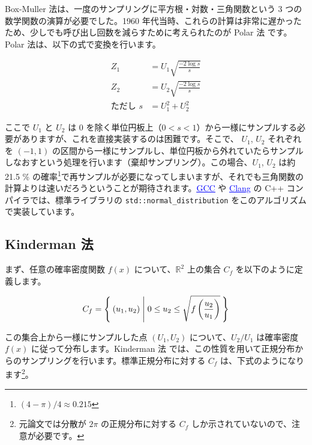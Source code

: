 \documentclass[twocolumn, dvipdfmx]{jsarticle}
\begin{document}
Box-Muller 法は、一度のサンプリングに平方根・対数・三角関数という 3 つの数学関数の演算が必要でした。1960 年代当時、これらの計算は非常に遅かったため、少しでも呼び出し回数を減らすために考えられたのが Polar 法 \cite{marsaglia1964convinient} です。Polar 法は、以下の式で変換を行います。

\begin{align*}
    Z_1 &= U_1 \sqrt{\frac{-2 \log s}{s}} \\
    Z_2 &= U_2 \sqrt{\frac{-2 \log s}{s}} \\
    \textrm{ただし } s &= U_1 ^2 + U_2 ^2
\end{align*}

ここで $U_1$ と $U_2$ は $0$ を除く単位円板上（$0 < s < 1$）から一様にサンプルする必要がありますが、これを直接実装するのは困難です。そこで、 $U_1$, $U_2$ それぞれを $(-1, 1)$ の区間から一様にサンプルし、単位円板から外れていたらサンプルしなおすという処理を行います（棄却サンプリング）。この場合、$U_1$, $U_2$ は約 21.5 \% の確率\footnote{$(4 - \pi) / 4 \approx 0.215$}で再サンプルが必要になってしまいますが、それでも三角関数の計算よりは速いだろうということが期待されます。\href{https://github.com/gcc-mirror/gcc/blob/60d9f254876a00260992b2f37639ef4d82d9db8f/libstdc++-v3/include/bits/random.tcc#L1818-L1830}{\textcolor{blue}{\underline{GCC}}} や \href{https://github.com/llvm/llvm-project/blob/31dfaff3b395a19f23bb1010bfcec67452efe02d/libcxx/include/random#L4370-L4383}{\textcolor{blue}{\underline{Clang}}} の C++ コンパイラでは、標準ライブラリの \texttt{std::normal\_distribution} をこのアルゴリズムで実装しています。

\subsection*{Kinderman 法}

まず、任意の確率密度関数 $f(x)$ について、$\mathbb{R}^2$ 上の集合 $C_f$ を以下のように定義します。

\begin{align*}
    C_f = \Set{ (u_1, u_2) | 0 \leq u_2 \leq \sqrt{f\left(\frac{u_2}{u_1}\right)} }
\end{align*}

この集合上から一様にサンプルした点 $(U_1, U_2)$ について、${U_2} / {U_1}$ は確率密度 $f(x)$ に従って分布します。Kinderman 法 \cite{kinderman1977computer} では、この性質を用いて正規分布からのサンプリングを行います。標準正規分布に対する $C_f$ は、下式のようになります\footnote{元論文では分散が $2\pi$ の正規分布に対する $C_f$ しか示されていないので、注意が必要です。}。
\end{document}
